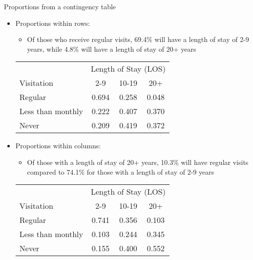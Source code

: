 \documentclass[xcolor=dvipsnames]{beamer}
\begin{document}
\begin{frame}{Proportions from a contingency table}
\begin{itemize}
	\item Proportions within rows:
	\begin{itemize}
		\item Of those who receive regular visits, 69.4\% will have a length of stay of 2-9 years, while 4.8\% will have a length of stay of 20+ years
	\end{itemize}
	{\scriptsize
		\begin{center}
			\begin{tabular}{|l|ccc|}
				\hline
				& \multicolumn{3}{c|}{Length of Stay (LOS)}\\
				Visitation & 2-9 & 10-19 & 20+ \\ \hline
				Regular           & 0.694 & 0.258 & 0.048 \\
				Less than monthly & 0.222 & 0.407 & 0.370 \\
				Never             & 0.209 & 0.419 & 0.372 \\ \hline
			\end{tabular}
	\end{center}}
	\vspace{1mm}
	\item Proportions within columns:
	\begin{itemize}
		\item Of those with a length of stay of 20+ years, 10.3\% will have regular visits compared to 74.1\% for those with a length of stay of 2-9 years 
	\end{itemize}
	{\scriptsize
		\begin{center}
			\begin{tabular}{|l|ccc|}
				\hline
				& \multicolumn{3}{c|}{Length of Stay (LOS)}\\
				Visitation & 2-9 & 10-19 & 20+ \\ \hline
				Regular            &0.741  &0.356  &0.103 \\
				Less than monthly  &0.103  &0.244  &0.345 \\
				Never              &0.155  &0.400  &0.552 \\ \hline
			\end{tabular}
	\end{center}}
\end{itemize}
\end{frame}
\end{document}
